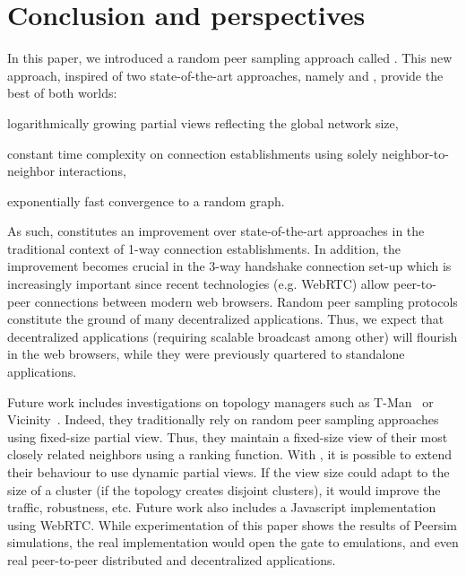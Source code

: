 
\section{Conclusion and perspectives}
\label{sec:conclusion}

In this paper, we introduced a random peer sampling approach called
\SPRAY.  This new approach, inspired of two state-of-the-art approaches,
namely \SCAMP and \CYCLON, provide the best of both worlds:
\begin{inparaenum}[(i)]
\item logarithmically growing partial views reflecting the global network size,
\item constant time complexity on connection establishments using solely
  neighbor-to-neighbor interactions,
\item exponentially fast convergence to a random graph.
\end{inparaenum}
As such, \SPRAY constitutes an improvement over state-of-the-art
approaches in the traditional context of 1-way connection establishments. In
addition, the improvement becomes crucial in the 3-way handshake connection
set-up which is increasingly important since recent technologies (e.g. WebRTC)
allow peer-to-peer connections between modern web browsers. Random peer
sampling protocols constitute the ground of many decentralized applications.
Thus, we expect that decentralized applications (requiring scalable broadcast
among other) will flourish in the web browsers, while they were previously
quartered to standalone applications.

Future work includes investigations on topology managers such as
T-Man~\cite{jelasity2009tman} or Vicinity~\cite{voulgaris2005epidemic}. Indeed,
they traditionally rely on random peer sampling approaches using fixed-size
partial view. Thus, they maintain a fixed-size view of their most closely
related neighbors using a ranking function. With \SPRAY, it is possible to
extend their behaviour to use dynamic partial views. If the view size could
adapt to the size of a cluster (if the topology creates disjoint clusters), it
would improve the traffic, robustness, etc. Future work also includes a
Javascript implementation using WebRTC. While experimentation of this paper
shows the results of Peersim simulations, the real implementation would open
the gate to emulations, and even real peer-to-peer distributed and
decentralized applications.

